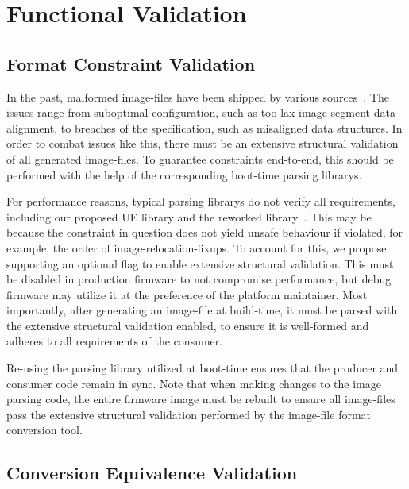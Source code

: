 
\section{Functional Validation}

\subsection{Format Constraint Validation}
\label{sec:constr_val}

In the past, malformed \glspl{image-file} have been shipped by various sources~\cite{ipxe-fix,gnu-efi-fix}. The issues range from suboptimal configuration, such as too lax \gls{image-segment} \gls{data-alignment}, to breaches of the  specification, such as misaligned data structures. In order to combat issues like this, there must be an extensive structural validation of all generated \glspl{image-file}. To guarantee constraints end-to-end, this should be performed with the help of the corresponding boot-time parsing \glspl{library}.

For performance reasons, typical parsing \glspl{library} do not verify all requirements, including our proposed \gls{UE} \gls{library} and the reworked  \gls{library}~\cite{secure-pe}. This may be because the constraint in question does not yield unsafe behaviour if violated, for example, the order of \glspl{image-relocation-fixup}. To account for this, we propose supporting an optional flag to enable extensive structural validation. This must be disabled in production \gls{firmware} to not compromise performance, but debug \gls{firmware} may utilize it at the preference of the platform maintainer. Most importantly, after generating an \gls{image-file} at build-time, it must be parsed with the extensive structural validation enabled, to ensure it is well-formed and adheres to all requirements of the consumer.

Re-using the parsing \gls{library} utilized at boot-time ensures that the producer and consumer code remain in sync. Note that when making changes to the \gls{image} parsing code, the entire \gls{firmware} \gls{image} must be rebuilt to ensure all \glspl{image-file} pass the extensive structural validation performed by the \gls{image-file} format conversion tool.

\subsection{Conversion Equivalence Validation}
\label{sec:conv_eq}

